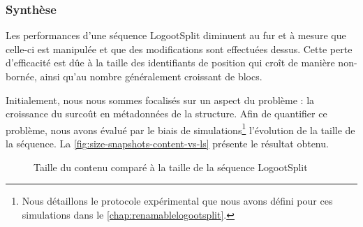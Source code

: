 \subsubsection{Synthèse}

Les performances d'une séquence LogootSplit diminuent au fur et à mesure que celle-ci est manipulée et que des modifications sont effectuées dessus.
Cette perte d'efficacité est dûe à la taille des identifiants de position qui croît de manière non-bornée, ainsi qu'au nombre généralement croissant de blocs.

Initialement, nous nous sommes focalisés sur un aspect du problème : la croissance du surcoût en métadonnées de la structure.
Afin de quantifier ce problème, nous avons évalué par le biais de simulations\footnote{Nous détaillons le protocole expérimental que nous avons défini pour ces simulations dans le \autoref{chap:renamablelogootsplit}.} l'évolution de la taille de la séquence.
La \autoref{fig:size-snapshots-content-vs-ls} présente le résultat obtenu.

\begin{figure}[!ht]

  \centering
  \caption{Taille du contenu comparé à la taille de la séquence LogootSplit}
  \label{fig:size-snapshots-content-vs-ls}
\end{figure}


